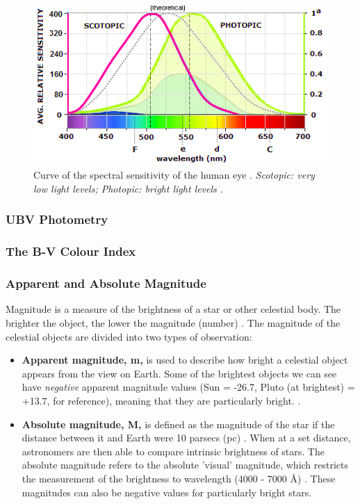 \documentclass[12pt]{article}
\begin{document}
\begin{figure}[H]
    \centering
    \includegraphics[width=12.5cm]{eye spectra curve.png}
    \caption{\centering Curve of the spectral sensitivity of the human eye \protect\cite{eyecurve}. \textit{Scotopic: very low light levels; Photopic: bright light levels \protect\cite{scophoto}.}}
    \label{fig:1}
\end{figure}

\subsubsection{UBV Photometry} \label{sec:1.1.1}



\subsubsection{The B-V Colour Index} \label{sec:1.1.2}



\subsubsection{Apparent and Absolute Magnitude} \label{sec:1.1.3}

Magnitude is a measure of the brightness of a star or other celestial body. The brighter the object, the lower the magnitude (number)
\cite{britmag}.
The magnitude of the celestial objects are divided into two types of observation:

\begin{itemize}
    \item \textbf{Apparent magnitude, m,} is used to describe how bright a celestial object appears from the view on Earth. Some of the brightest objects we can see
    have \textit{negative} apparent magnitude values (Sun = -26.7, Pluto (at brightest) = +13.7, for reference), meaning that they are particularly bright.
    \cite{lcomag}.
    \item \textbf{Absolute magnitude, M,} is defined as the magnitude of the star if the distance between it and Earth were 10 parsecs (pc)
    \cite{lcoabsmag,cosmosabsmag}.
    When at a set distance, astronomers are then able to compare intrinsic brightness of stars. The absolute magnitude refers to the absolute 'visual' magnitude, which restricts
    the measurement of the brightness to wavelength (4000 - 7000 Å)
    \cite{cosmosabsmag}.
    These magnitudes can also be negative values for particularly bright stars.
\end{itemize}
\end{document}

